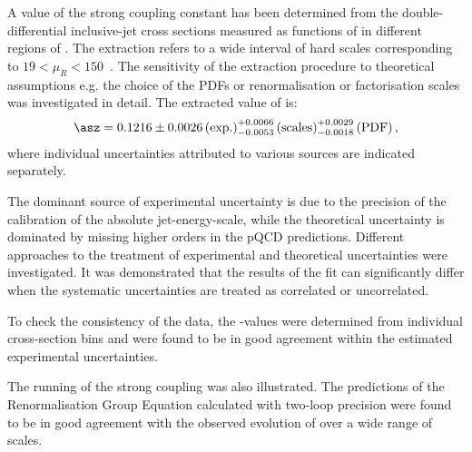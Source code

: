 A value of the strong coupling constant has been determined from the double-differential inclusive-jet cross sections measured as functions of \etjetb in different regions of \qsq. The extraction refers to a wide interval of hard scales corresponding to $19 < \mu_R < 150$~\GeV. The sensitivity of the extraction procedure to theoretical assumptions e.g. the choice of the PDFs or renormalisation or factorisation scales was investigated in detail. The extracted value of \asz is:
\begin{equation}
 \asz = 0.1216 \pm 0.0026\left(\text{exp.}\right)^{+0.0066}_{-0.0053}\left(\text{scales}\right)^{+0.0029}_{-0.0018}\left(\text{PDF}\right),
\end{equation}
where individual uncertainties attributed to various sources are indicated separately. 

The dominant source of experimental uncertainty is due to the precision of the calibration of the absolute jet-energy-scale, while the theoretical uncertainty is dominated by missing higher orders in the pQCD predictions.
Different approaches to the treatment of experimental and theoretical uncertainties were investigated. It was demonstrated that the results of the fit can significantly differ when the systematic uncertainties are treated as correlated or uncorrelated.

To check the consistency of the data, the \asz-values were determined from individual cross-section bins and were found to be in good agreement within the estimated experimental uncertainties.

The running of the strong coupling was also illustrated. The predictions of the Renormalisation Group Equation calculated with two-loop precision were found to be in good agreement with the observed evolution of \as over a wide range of scales.